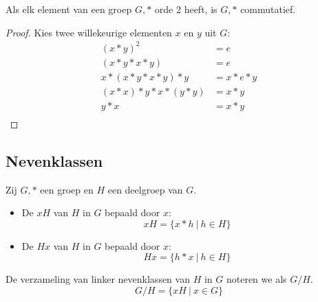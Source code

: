 \documentclass[main.tex]{subfiles}
\begin{document}
\begin{st}
  \label{st:groep-alles-orde-2-commutatief}
  Als elk element van een groep $G,*$ orde $2$ heeft, is $G,*$ commutatief.

  \begin{proof}
    Kies twee willekeurige elementen $x$ en $y$ uit $G$:
    \[ 
    \begin{array}{rl}
      (x*y)^{2} &= e\\
      (x*y*x*y) &= e\\
      x*(x*y*x*y)*y &= x*e*y\\
      (x*x)*y*x*(y*y) &= x*y\\
      y*x &= x*y\\
    \end{array}
    \]
  \end{proof}
\end{st}

\subsection{Nevenklassen}
\label{sec:nevenklassen}

\begin{de}
  \label{de:nevenklassen}
  Zij $G,*$ een groep en $H$ een deelgroep van $G$.
  \begin{itemize}
  \item De  $xH$ van $H$ in $G$ bepaald door $x$:
    \[ xH = \{ x * h\ |\ h \in H \} \]
  \item De  $Hx$ van $H$ in $G$ bepaald door $x$:
    \[ Hx = \{ h * x\ |\ h \in H \} \]
  \end{itemize}
  De verzameling van linker nevenklassen van $H$ in $G$ noteren we als $G/H$.
  \[ G/H = \{ xH\ |\ x \in G \} \]
\end{de}
\end{document}
